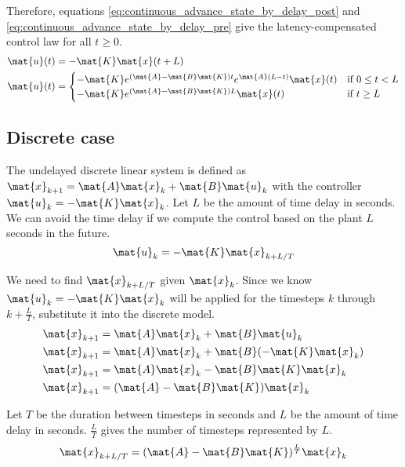 Therefore, equations \eqref{eq:continuous_advance_state_by_delay_post} and
\eqref{eq:continuous_advance_state_by_delay_pre} give the latency-compensated
control law for all $t \geq 0$.
\begin{align}
  \mat{u}(t) &= -\mat{K} \mat{x}(t + L) \nonumber \\
  \mat{u}(t) &=
  \begin{cases}
    -\mat{K} e^{(\mat{A} - \mat{B}\mat{K})t} e^{\mat{A}(L - t)} \mat{x}(t) &
      \text{if } 0 \leq t < L \\
    -\mat{K} e^{(\mat{A} - \mat{B}\mat{K})L} \mat{x}(t) & \text{if } t \geq L
  \end{cases}
\end{align}

\subsection{Discrete case}

The undelayed discrete linear system is defined as
$\mat{x}_{k+1} = \mat{A}\mat{x}_k + \mat{B}\mat{u}_k$ with the controller
$\mat{u}_k = -\mat{K}\mat{x}_k$. Let $L$ be the amount of time delay in seconds.
We can avoid the time delay if we compute the control based on the plant $L$
seconds in the future.
\begin{equation*}
  \mat{u}_k = -\mat{K}\mat{x}_{k + L/T}
\end{equation*}

We need to find $\mat{x}_{k + L/T}$ given $\mat{x}_k$. Since we know
$\mat{u}_k = -\mat{K}\mat{x}_k$ will be applied for the timesteps $k$ through
$k + \frac{L}{T}$, substitute it into the discrete model.
\begin{align*}
  \mat{x}_{k+1} &= \mat{A}\mat{x}_k + \mat{B}\mat{u}_k \\
  \mat{x}_{k+1} &= \mat{A}\mat{x}_k + \mat{B}(-\mat{K}\mat{x}_k) \\
  \mat{x}_{k+1} &= \mat{A}\mat{x}_k - \mat{B}\mat{K}\mat{x}_k \\
  \mat{x}_{k+1} &= (\mat{A} - \mat{B}\mat{K}) \mat{x}_k
\end{align*}

Let $T$ be the duration between timesteps in seconds and $L$ be the amount of
time delay in seconds. $\frac{L}{T}$ gives the number of timesteps represented
by $L$.
\begin{equation}
  \mat{x}_{k + L/T} = (\mat{A} - \mat{B}\mat{K})^\frac{L}{T} \mat{x}_k
    \label{eq:discrete_advance_state_by_delay_post}
\end{equation}

